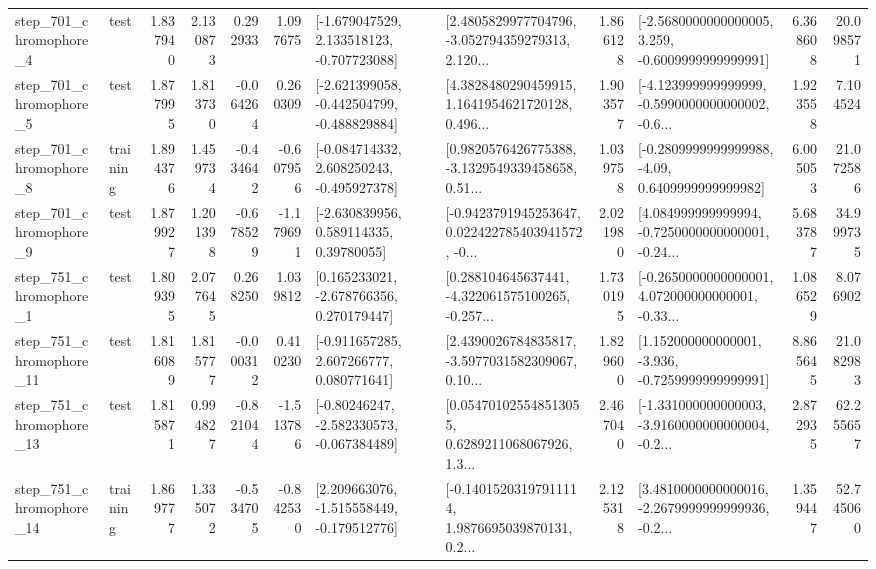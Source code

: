 \begin{tabular}{llrrrrllrlrr}
   step\_701\_chromophore\_4 &      test &      1.837940 &    2.130873 &      0.292933 &  1.097675 &   [-1.679047529, 2.133518123, -0.707723088] &  [2.4805829977704796, -3.052794359279313, 2.120... &       1.866128 &  [-2.5680000000000005, 3.259, -0.6009999999999991] &            6.368608 &         20.098571 \\
   step\_701\_chromophore\_5 &      test &      1.877995 &    1.813730 &     -0.064264 &  0.260309 &  [-2.621399058, -0.442504799, -0.488829884] &  [4.3828480290459915, 1.1641954621720128, 0.496... &       1.903577 &  [-4.123999999999999, -0.5990000000000002, -0.6... &            1.923558 &          7.104524 \\
   step\_701\_chromophore\_8 &  training &      1.894376 &    1.459734 &     -0.434642 & -0.607956 &   [-0.084714332, 2.608250243, -0.495927378] &  [0.9820576426775388, -3.1329549339458658, 0.51... &       1.039758 &   [-0.2809999999999988, -4.09, 0.6409999999999982] &            6.005053 &         21.072586 \\
   step\_701\_chromophore\_9 &      test &      1.879927 &    1.201398 &     -0.678529 & -1.179691 &     [-2.630839956, 0.589114335, 0.39780055] &  [-0.9423791945253647, 0.022422785403941572, -0... &       2.021980 &  [4.084999999999994, -0.7250000000000001, -0.24... &            5.683787 &         34.999735 \\
   step\_751\_chromophore\_1 &      test &      1.809395 &    2.077645 &      0.268250 &  1.039812 &    [0.165233021, -2.678766356, 0.270179447] &  [0.288104645637441, -4.322061575100265, -0.257... &       1.730195 &  [-0.2650000000000001, 4.072000000000001, -0.33... &            1.086529 &          8.076902 \\
  step\_751\_chromophore\_11 &      test &      1.816089 &    1.815777 &     -0.000312 &  0.410230 &    [-0.911657285, 2.607266777, 0.080771641] &  [2.4390026784835817, -3.5977031582309067, 0.10... &       1.829600 &   [1.152000000000001, -3.936, -0.7259999999999991] &            8.865645 &         21.082983 \\
  step\_751\_chromophore\_13 &      test &      1.815871 &    0.994827 &     -0.821044 & -1.513786 &   [-0.80246247, -2.582330573, -0.067384489] &  [0.054701025548513055, 0.6289211068067926, 1.3... &       2.467040 &  [-1.331000000000003, -3.9160000000000004, -0.2... &            2.872935 &         62.255657 \\
  step\_751\_chromophore\_14 &  training &      1.869777 &    1.335072 &     -0.534705 & -0.842530 &   [2.209663076, -1.515558449, -0.179512776] &  [-0.14015203197911114, 1.9876695039870131, 0.2... &       2.125318 &  [3.4810000000000016, -2.2679999999999936, -0.2... &            1.359447 &         52.745060 \\

\end{tabular}
